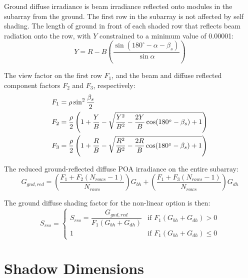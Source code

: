 \documentclass[12pt,letterpaper]{article}
\begin{document}
Ground diffuse irradiance is beam irradiance reflected onto modules in the subarray from the ground. The first row in the subarray is not affected by self shading. The length of ground in front of each shaded row that reflects beam radiation onto the row, with $Y$ constrained to a minimum value of 0.00001:
\begin{equation}
Y = R - B \left(\frac{\sin( 180^\circ - \alpha - \beta_s )}{\sin\alpha} \right)
\end{equation}

The view factor on the first row $\mathit{F_1}$, and the beam and diffuse reflected component factors $\mathit{F_2}$ and $\mathit{F_3}$, respectively:
\begin{align}
F_1 &= \mathit{\rho} \sin^2\frac{\beta_s}{2} \notag\\
F_2 &= \frac{\mathit{\rho}}{2} \left( 1 + \frac{Y}{B} - \sqrt{ \frac{Y^2}{B^2} - \frac{2Y}{B} \cos(180^\circ - \beta_s) + 1 }\right) \notag\\
F_3 &= \frac{\mathit{\rho}}{2} \left( 1 + \frac{R}{B} - \sqrt{ \frac{R^2}{B^2} - \frac{2R}{B} \cos(180^\circ - \beta_s) + 1 } \right)
\end{align}

The reduced ground-reflected diffuse POA irradiance on the entire subarray:
\begin{equation}
G_{gnd,red}=\left(\frac{F_1+F_2(N_{rows}-1)}{N_{rows}}\right)G_{bh}+\left(\frac{F_1+F_3(N_{rows}-1)}{N_{rows}}\right)G_{dh}
\end{equation}

The ground  diffuse shading factor for the non-linear option is then:
\begin{equation}
S_{rss}=
 \left\{
     \begin{array}{ll}
      S_{rss} = \dfrac{G_{gnd,red}}{F_1 (G_{bh} +  G_{dh})}
      & \mbox{if $F_1 (G_{bh} + G_{dh}) > 0$}\\
      1 
      & \mbox{if $F_1 (G_{bh} + G_{dh}) \leq 0$}
    \end{array}
  \right.
\end{equation}

\section{Shadow Dimensions} \label{sec-selfshaddimensions}
\end{document}
